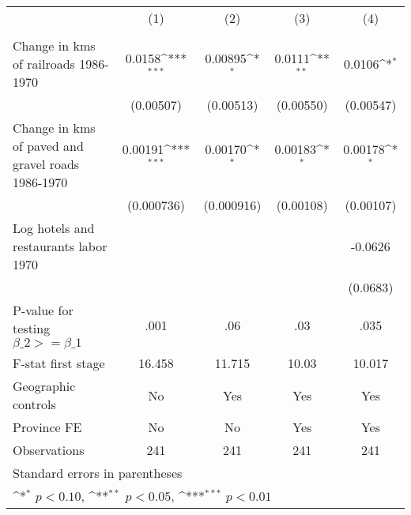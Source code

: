 {
\def\sym#1{\ifmmode^{#1}\else\(^{#1}\)\fi}
\begin{tabular}{l*{4}{c}}
\hline\hline
                &\multicolumn{1}{c}{(1)}&\multicolumn{1}{c}{(2)}&\multicolumn{1}{c}{(3)}&\multicolumn{1}{c}{(4)}\\
                &\multicolumn{1}{c}{}&\multicolumn{1}{c}{}&\multicolumn{1}{c}{}&\multicolumn{1}{c}{}\\
\hline
Change in kms of railroads 1986-1970&   0.0158\sym{***}&  0.00895\sym{*}  &   0.0111\sym{**} &   0.0106\sym{*}  \\
                &(0.00507)         &(0.00513)         &(0.00550)         &(0.00547)         \\
[1em]
Change in kms of paved and gravel roads 1986-1970&  0.00191\sym{***}&  0.00170\sym{*}  &  0.00183\sym{*}  &  0.00178\sym{*}  \\
                &(0.000736)         &(0.000916)         &(0.00108)         &(0.00107)         \\
[1em]
Log hotels and restaurants labor 1970&                  &                  &                  &  -0.0626         \\
                &                  &                  &                  & (0.0683)         \\
\hline
P-value for testing $\beta\_{2} >= \beta\_{1}$&     .001         &      .06         &      .03         &     .035         \\
F-stat first stage&   16.458         &   11.715         &    10.03         &   10.017         \\
Geographic controls&       No         &      Yes         &      Yes         &      Yes         \\
Province FE     &       No         &       No         &      Yes         &      Yes         \\
Observations    &      241         &      241         &      241         &      241         \\
\hline\hline
\multicolumn{5}{l}{\footnotesize Standard errors in parentheses}\\
\multicolumn{5}{l}{\footnotesize \sym{*} \(p<0.10\), \sym{**} \(p<0.05\), \sym{***} \(p<0.01\)}\\
\end{tabular}
}
